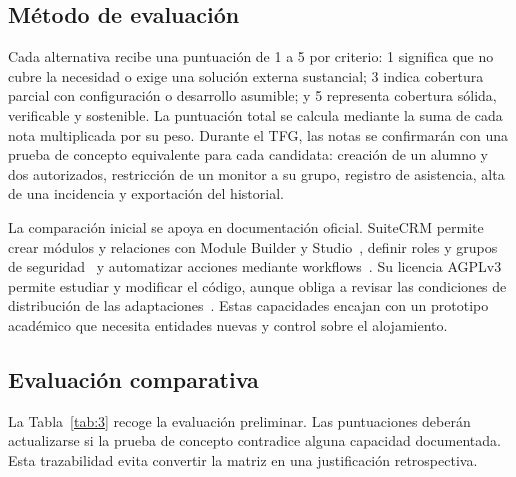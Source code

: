 \subsection{Método de evaluación}\label{sec:1-2-5}

Cada alternativa recibe una puntuación de 1 a 5 por criterio: 1 significa que no cubre la necesidad o exige una solución externa sustancial; 3 indica cobertura parcial con configuración o desarrollo asumible; y 5 representa cobertura sólida, verificable y sostenible. La puntuación total se calcula mediante la suma de cada nota multiplicada por su peso. Durante el TFG, las notas se confirmarán con una prueba de concepto equivalente para cada candidata: creación de un alumno y dos autorizados, restricción de un monitor a su grupo, registro de asistencia, alta de una incidencia y exportación del historial.

La comparación inicial se apoya en documentación oficial. SuiteCRM permite crear módulos y relaciones con Module Builder y Studio~\cite{ref07}, definir roles y grupos de seguridad~\cite{ref08} y automatizar acciones mediante workflows~\cite{ref09}. Su licencia AGPLv3 permite estudiar y modificar el código, aunque obliga a revisar las condiciones de distribución de las adaptaciones~\cite{ref06}. Estas capacidades encajan con un prototipo académico que necesita entidades nuevas y control sobre el alojamiento.

\subsection{Evaluación comparativa}\label{sec:1-2-6}

La Tabla~\ref{tab:3} recoge la evaluación preliminar. Las puntuaciones deberán actualizarse si la prueba de concepto contradice alguna capacidad documentada. Esta trazabilidad evita convertir la matriz en una justificación retrospectiva.

